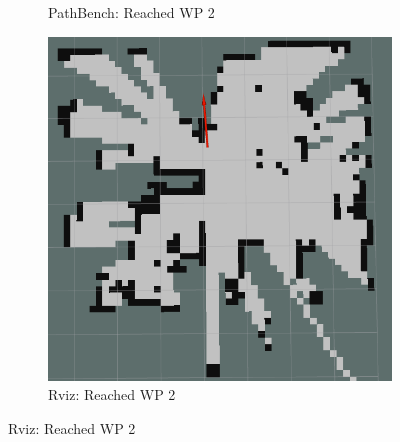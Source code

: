 \begin{figure}[htb]
\begin{subfigure}[b]{0.32\linewidth}
     \caption{PathBench: Reached WP 2}
  \end{subfigure}
  \hfill
  \begin{subfigure}[b]{0.32\linewidth}
    \includegraphics[width=\linewidth]{images/real/sys/4_3.png}
     \caption{Rviz: Reached WP 2}
  \end{subfigure}
  
  \newline
  

\end{figure}
